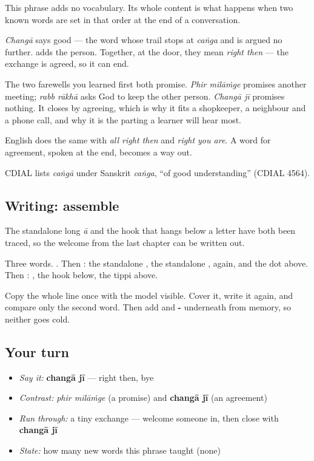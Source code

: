 \begin{cousinweb}
This phrase adds no vocabulary. Its whole content is what happens when two known words are set in that order at the end of a conversation.

\emph{Changā} says good — the word whose trail stops at \emph{caṅga} and is argued no further. \textbf{} adds the person. Together, at the door, they mean \emph{right then} — the exchange is agreed, so it can end.

The two farewells you learned first both promise. \emph{Phir milāṁge} promises another meeting; \emph{rabb rākhā} asks God to keep the other person. \emph{Changā jī} promises nothing. It closes by agreeing, which is why it fits a shopkeeper, a neighbour and a phone call, and why it is the parting a learner will hear most.

English does the same with \emph{all right then} and \emph{right you are}. A word for agreement, spoken at the end, becomes a way out.

CDIAL lists \emph{caṅgā} under Sanskrit \emph{caṅga}, \textquotedblleft{}of good understanding\textquotedblright{} (CDIAL 4564).
\end{cousinweb}

\subsection*{Writing: assemble   }
The standalone long \emph{ā} and the hook that hangs below a letter have both been traced, so the welcome from the last chapter can be written out.

Three words. \textbf{}. Then \textbf{}: the standalone \textbf{}, the standalone \textbf{}, \textbf{} again, and the dot \textbf{} above. Then \textbf{}: \textbf{}, the hook below, the tippi above.

Copy the whole line once with the model visible. Cover it, write it again, and compare only the second word. Then add \textbf{} and \textbf{-} underneath from memory, so neither goes cold.

\subsection*{Your turn}
\begin{itemize}
\raggedright
  \item \emph{Say it:} \textbf{changā jī} — right then, bye
  \item \emph{Contrast:} \emph{phir milāṁge} (a promise) and \textbf{changā jī} (an agreement)
  \item \emph{Run through:} a tiny exchange — welcome someone in, then close with \textbf{changā jī}
  \item \emph{State:} how many new words this phrase taught (none)
\end{itemize}

